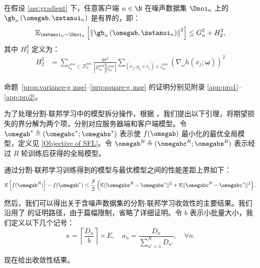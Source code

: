 \begin{proposition}[均方差损失下含标签噪声的随机梯度的平方的期望]\label{prp:square-g mse}
在假设 \ref{ass:gradient} 下，任意客户端 $n\in\N$ 在噪声数据集 $\Dnoi_n$ 上的 $\gb_n\left(\omegab,\zetanoi_n\right)$ 是有界的，即：
\begin{equation}
    \mathbb{E}_{\zetanoi_n\sim \Dnoi_n}\left[\left\Vert \gb_n\left(\omegab, \zetanoi_n\right) \right\Vert^2\right] \leq G_n^2 + H_2^2,
\end{equation}
其中 $H_2^2$ 定义为：
\begin{align}\label{eq:H}
    H_2^2 &= \sum_{\zeta_n^{noi}\subset\mathcal{D}_n^{noi}} \frac{4\sigma^2}{|\mathcal{D}_n^{noi}||\zeta_n^{noi}|}\sum_{\left(x_{j},y_{j}+\epsilon_{j}\right)\in \zeta_n^{noi}}\left(
\nabla_\omega  h\left(x_{j};\boldsymbol{\omega}\right)\right)^2
\end{align}
\end{proposition}

命题~\ref{prop:variance-g mse}--\ref{prp:square-g mse} 的证明分别见附录 \ref{app:pro1}--\ref{app:pro2}。

为了处理分割-联邦学习中的模型拆分操作，根据 \cite{b8}，我们提出以下引理，将期望损失的界分解为两个项，分别对应服务器端和客户端模型。令 $\omegab^*\triangleq(\omegabc^*; \omegabs^*)$ 表示使 $f(\omegab)$ 最小化的最优全局模型，定义见 \eqref{Objective of SFL}。令 $\omegab^R\triangleq(\omegabc^R; \omegabs^R)$ 表示经过 $R$ 轮训练后获得的全局模型。

\begin{lemma}\label{lemma:decomp}
通过分割-联邦学习训练得到的模型与最优模型之间的性能差距上界如下：
\begin{equation}
\mathbb{E}\left[f(\omegab^{R})\right]- f(\omegab^*)\le\frac{S}{2}\left(\mathbb{E}||\omegabs^{R}-\omegabs^*||^2+\mathbb{E}||\omegabc^{R}-\omegabc^*||^2\right).
\end{equation}
\end{lemma}

然后，我们可以得出关于含噪声数据集的分割-联邦学习收敛性的主要结果。我们沿用了 \cite{b8} 的证明路径，由于篇幅限制，省略了详细证明。令 $b$ 表示小批量大小，我们定义以下几个记号：
$$
\kappa= \left\lceil \frac{D_n}{b} \right\rceil \times E, \quad a_n= \frac{D_n}{\sum_{n'=1}^{N}D_{n'}}, \quad \forall n.
$$

现在给出收敛性结果。

